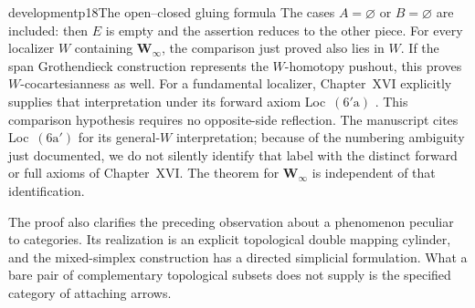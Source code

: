\begin{dcomment}{development}{p18}{The open--closed gluing formula}
The cases $A=\varnothing$ or $B=\varnothing$ are included: then $E$ is empty and the assertion reduces to the other piece. For every localizer $W$ containing $\mathbf W_\infty$, the comparison just proved also lies in $W$. If the span Grothendieck construction represents the $W$-homotopy pushout, this proves $W$-cocartesianness as well. For a fundamental localizer, Chapter~XVI explicitly supplies that interpretation under its forward axiom Loc~$(6'\mathrm a)$ \citep[\S3, ms.~24, footnote~15]{GrothendieckDerivateursXVI}. This comparison hypothesis requires no opposite-side reflection. The manuscript cites Loc~$(6\mathrm a')$ for its general-$W$ interpretation; because of the numbering ambiguity just documented, we do not silently identify that label with the distinct forward or full axioms of Chapter~XVI. The theorem for $\mathbf W_\infty$ is independent of that identification.

The proof also clarifies the preceding observation about a phenomenon peculiar to categories. Its realization is an explicit topological double mapping cylinder, and the mixed-simplex construction has a directed simplicial formulation. What a bare pair of complementary topological subsets does not supply is the specified category of attaching arrows.
\end{dcomment}

